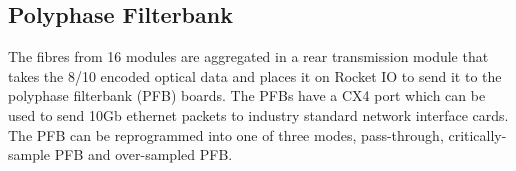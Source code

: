 \subsection{Polyphase Filterbank}
The fibres from 16 modules are aggregated in a rear transmission module that takes the 8/10 encoded optical data and places it on Rocket IO to send it to the polyphase filterbank (PFB) boards. The PFBs have a CX4 port which can be used to send 10Gb ethernet packets to industry standard network interface cards. The PFB can be reprogrammed into one of three modes, pass-through, critically-sample PFB and over-sampled PFB.